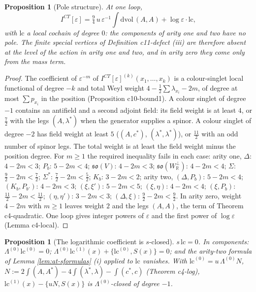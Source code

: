 \documentclass[11pt]{article}
\numberwithin{equation}{section}
\theoremstyle{plain}
\newtheorem{proposition}[theorem]{Proposition}
\theoremstyle{definition}
\newcommand{\ICT}{I^{CT}[\varepsilon]}
\newcommand{\lc}{\mathrm{lc}}
\begin{document}
\begin{proposition}[Pole structure]
\label{prop:at-poles}
At one loop,
\[
\ICT=\tfrac94\,u\,\varepsilon^{-1}\int\mathrm{dvol}\,(A,A)+\log\varepsilon\cdot\lc,
\]
with $\lc$ a local cochain of degree $0$: the components of arity one and two have no pole. The finite special vertices of Definition c11-defect (iii) are therefore absent at the level of the action in arity one and two, and in arity zero they come only from the mass term.
\end{proposition}

\begin{proof}
The coefficient of $\varepsilon^{-m}$ of $\ICT^{(k)}(x_1,\dots,x_k)$ is a colour-singlet local functional of degree $-k$ and total Weyl weight $4-\tfrac12\sum\lambda_{x_i}-2m$, of degree at most $\sum p_{x_i}$ in the position (Proposition c10-bound1). A colour singlet of degree $-1$ contains an antifield and a second adjoint field: its field weight is at least $4$, or $\tfrac72$ with the legs $(A,\lambda^*)$ when the generator supplies a spinor. A colour singlet of degree $-2$ has field weight at least $5$ ($(A,c^*)$, $(\lambda^*,\lambda^*)$), or $\tfrac{11}2$ with an odd number of spinor legs. The total weight is at least the field weight minus the position degree. For $m\ge1$ the required inequality fails in each case: arity one, $\Delta$: $4-2m<3$; $P_b$: $5-2m<4$; $\mathfrak{so}(V)$: $4-2m<3$; $\mathfrak{so}(W^\perp_{\mathbb R})$: $4-2m<4$; $\Sigma$: $\tfrac92-2m<\tfrac72$; $\Sigma^*$: $\tfrac72-2m<\tfrac52$; $K_b$: $3-2m<2$; arity two, $(\Delta,P_b)$: $5-2m<4$; $(K_b,P_{b'})$: $4-2m<3$; $(\xi,\xi')$: $5-2m<5$; $(\xi,\eta)$: $4-2m<4$; $(\xi,P_b)$: $\tfrac{11}2-2m<\tfrac{11}2$; $(\eta,\eta')$: $3-2m<3$; $(\Delta,\xi)$: $\tfrac92-2m<\tfrac92$. In arity zero, weight $4-2m$ with $m\ge1$ leaves weight $2$ and the legs $(A,A)$, the term of Theorem c4-quadratic. One loop gives integer powers of $\varepsilon$ and the first power of $\log\varepsilon$ (Lemma c4-local).
\end{proof}

\begin{proposition}[The logarithmic coefficient is $s$-closed]
\label{prop:at-log}
$s\,\lc=0$. In components: $\Lambda^{(0)}\lc^{(0)}=0$; $\Lambda^{(0)}\lc^{(1)}(x)+\{\lc^{(0)},S(x)\}=0$; and the arity-two formula of Lemma \ref{lem:at-sformulas} (i) applied to $\lc$ vanishes. With $\lc^{(0)}=u\,\Lambda^{(0)}N$, $N:=2\int(A,A^*)-4\int(\lambda^*,\lambda)-\int(c^*,c)$ (Theorem c4-log), $\lc^{(1)}(x)-\{uN,S(x)\}$ is $\Lambda^{(0)}$-closed of degree $-1$.
\end{proposition}
\end{document}
